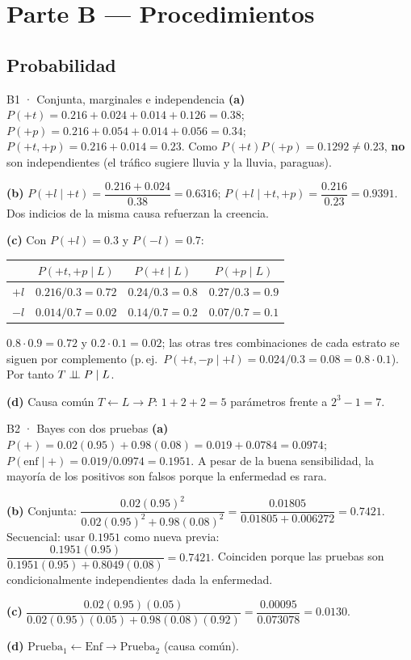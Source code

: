 \newpage
\section{Parte B — Procedimientos}

\subsection{Probabilidad}

\begin{solucion}{B1 · Conjunta, marginales e independencia}
\textbf{(a)} $P(+t)=0.216+0.024+0.014+0.126=0.38$; $P(+p)=0.216+0.054+0.014+0.056=0.34$;
$P(+t,+p)=0.216+0.014=0.23$. Como $P(+t)P(+p)=0.1292\ne0.23$, \textbf{no} son independientes (el tráfico sugiere lluvia y la lluvia, paraguas).

\textbf{(b)} $P(+l\mid+t)=\dfrac{0.216+0.024}{0.38}=0.6316$; \quad $P(+l\mid+t,+p)=\dfrac{0.216}{0.23}=0.9391$. Dos indicios de la misma causa refuerzan la creencia.

\textbf{(c)} Con $P(+l)=0.3$ y $P(-l)=0.7$:
\begin{center}\small
\begin{tabular}{c|ccc}
 & $P(+t,+p\mid L)$ & $P(+t\mid L)$ & $P(+p\mid L)$\\\hline
$+l$ & $0.216/0.3=0.72$ & $0.24/0.3=0.8$ & $0.27/0.3=0.9$\\
$-l$ & $0.014/0.7=0.02$ & $0.14/0.7=0.2$ & $0.07/0.7=0.1$
\end{tabular}
\end{center}
$0.8\cdot0.9=0.72$ y $0.2\cdot0.1=0.02$; las otras tres combinaciones de cada estrato se siguen por complemento (p.\,ej.\ $P(+t,-p\mid+l)=0.024/0.3=0.08=0.8\cdot0.1$).
Por tanto $T\perp\!\!\!\perp P\mid L$.

\textbf{(d)} Causa común $T\leftarrow L\to P$: $1+2+2=5$ parámetros frente a $2^3-1=7$.
\end{solucion}

\begin{solucion}{B2 · Bayes con dos pruebas}
\textbf{(a)} $P(+)=0.02(0.95)+0.98(0.08)=0.019+0.0784=0.0974$; $P(\text{enf}\mid+)=0.019/0.0974=\mathbf{0.1951}$.
A pesar de la buena sensibilidad, la mayoría de los positivos son falsos porque la enfermedad es rara.

\textbf{(b)} Conjunta: $\dfrac{0.02(0.95)^2}{0.02(0.95)^2+0.98(0.08)^2}=\dfrac{0.01805}{0.01805+0.006272}=\mathbf{0.7421}$.
Secuencial: usar $0.1951$ como nueva previa: $\dfrac{0.1951(0.95)}{0.1951(0.95)+0.8049(0.08)}=0.7421$. Coinciden porque las pruebas son
condicionalmente independientes dada la enfermedad.

\textbf{(c)} $\dfrac{0.02(0.95)(0.05)}{0.02(0.95)(0.05)+0.98(0.08)(0.92)}=\dfrac{0.00095}{0.073078}=\mathbf{0.0130}$.

\textbf{(d)} $\text{Prueba}_1\leftarrow\text{Enf}\to\text{Prueba}_2$ (causa común).
\end{solucion}

